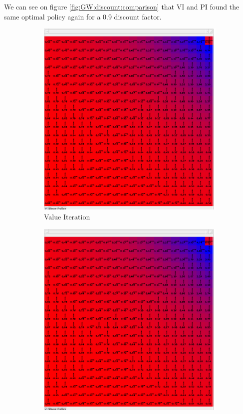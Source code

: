 \documentclass[10pt, twocolumn]{article}
\begin{document}
				We can see on figure \ref{fig:GW:discount:comparison} that VI and PI found the same optimal policy again for a 0.9 discount factor.

				\begin{figure}[]
					\centering
					\begin{subfigure}[t]{0.24\textwidth}
						\centering
						\includegraphics[width=\textwidth]{../graphics/GridWorld_0.9_vi_discount.png}
						\caption{Value Iteration}
						\label{fig:GW:discount:VI}
					\end{subfigure}
					\begin{subfigure}[t]{0.24\textwidth}
						\centering
						\includegraphics[width=\textwidth]{../graphics/GridWorld_0.9_pi_discount.png}

\end{subfigure}
\end{figure}
\end{document}
